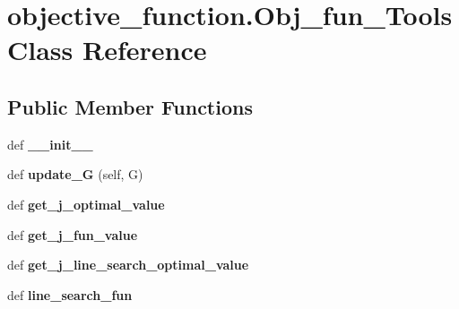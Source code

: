 \hypertarget{classobjective__function_1_1Obj__fun__Tools}{}\section{objective\+\_\+function.\+Obj\+\_\+fun\+\_\+\+Tools Class Reference}
\label{classobjective__function_1_1Obj__fun__Tools}
\subsection*{Public Member Functions}
\begin{DoxyCompactItemize}
\item 
\mbox{\label{classobjective__function_1_1Obj__fun__Tools_ad6b1ce6a3ff8c7931bf9c7e2b4642440}} 
def {\bfseries \+\_\+\+\_\+init\+\_\+\+\_\+}
\item 
\mbox{\label{classobjective__function_1_1Obj__fun__Tools_a1583922023dae598598278651bd1ac06}} 
def {\bfseries update\+\_\+G} (self, G)
\item 
\mbox{\label{classobjective__function_1_1Obj__fun__Tools_ad44e5a047ffa1afe0d63232146b6be3e}} 
def {\bfseries get\+\_\+j\+\_\+optimal\+\_\+value}
\item 
\mbox{\label{classobjective__function_1_1Obj__fun__Tools_a5758a1337e065bc94c35c59b61ed28d1}} 
def {\bfseries get\+\_\+j\+\_\+fun\+\_\+value}
\item 
\mbox{\label{classobjective__function_1_1Obj__fun__Tools_a8e9810b757352f7153b0d398227f4c2d}} 
def {\bfseries get\+\_\+j\+\_\+line\+\_\+search\+\_\+optimal\+\_\+value}
\item 
\mbox{\label{classobjective__function_1_1Obj__fun__Tools_ad4b42085d42d7ba4ea01cc4356b7d55a}} 
def {\bfseries line\+\_\+search\+\_\+fun}
\item 
\mbox{\label{classobjective__function_1_1Obj__fun__Tools_a0acae77849e6d5058127c3ce0b13c833}} 

\end{DoxyCompactItemize}
